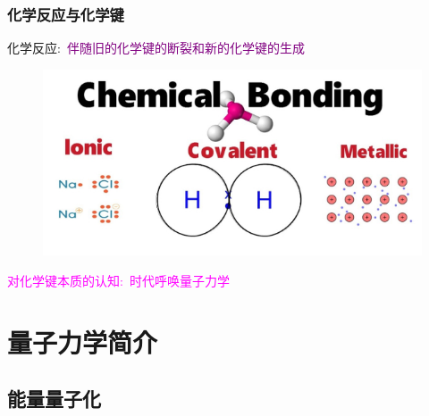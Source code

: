 \frame
{
	\frametitle{化学反应与化学键}
化学反应:~\textcolor{purple}{伴随旧的化学键的断裂和新的化学键的生成}
\begin{figure}[h!]
\centering
\includegraphics[height=0.50\textwidth,width=1.0\textwidth,viewport=0 0 580 280,clip]{Figures/Chemical_Bonding.jpg}
\label{Chemical_Bond-2}
\end{figure}
{\centering\textcolor{magenta}{对化学键本质的认知:~时代呼唤量子力学}}
}

\section{量子力学简介}
\subsection{能量量子化}


